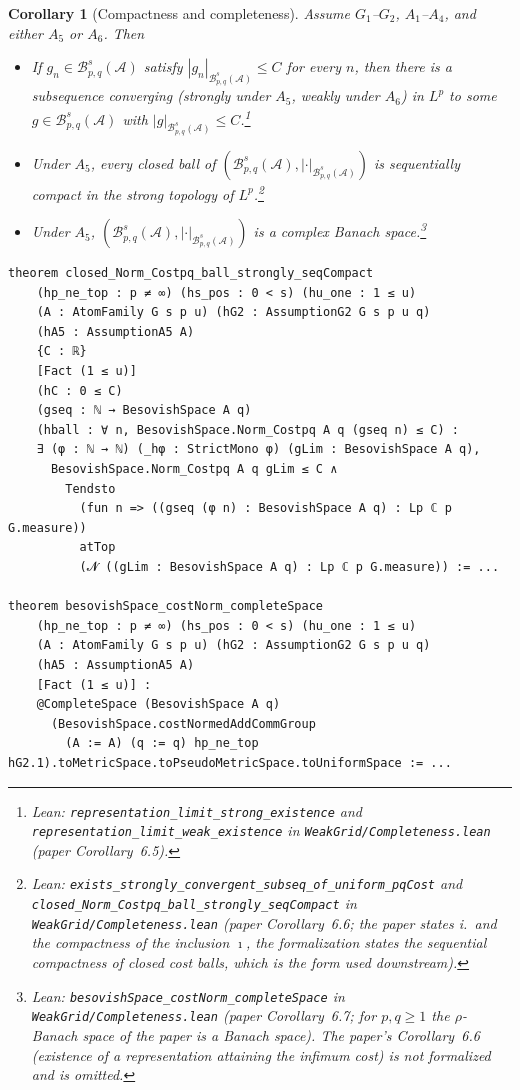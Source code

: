 \documentclass[11pt]{amsart}
\newtheorem{corollary}[theorem]{Corollary}
\theoremstyle{definition}
\newcommand{\lean}[1]{\texttt{#1}}
\begin{document}
\begin{corollary}[Compactness and completeness]\label{compa1}
Assume $G_1$--$G_2$, $A_1$--$A_4$, and either $A_5$ or $A_6$. Then
\begin{itemize}
\item[i.] If $g_n \in \mathcal{B}^s_{p,q}(\mathcal{A})$ satisfy
$|g_n|_{\mathcal{B}^s_{p,q}(\mathcal{A})}\leq C$ for every $n$, then there is
a subsequence converging (strongly under $A_5$, weakly under $A_6$) in $L^p$
to some $g \in \mathcal{B}^s_{p,q}(\mathcal{A})$ with
$|g|_{\mathcal{B}^s_{p,q}(\mathcal{A})}\leq C$.\footnote{Lean:
\lean{representation\_limit\_strong\_existence} and
\lean{representation\_limit\_weak\_existence} in
\lean{WeakGrid/Completeness.lean} (paper Corollary~6.5).}
\item[ii.] Under $A_5$, every closed ball of
$(\mathcal{B}^s_{p,q}(\mathcal{A}),|\cdot|_{\mathcal{B}^s_{p,q}(\mathcal{A})})$
is sequentially compact in the strong topology of
$L^p$.\footnote{Lean: \lean{exists\_strongly\_convergent\_subseq\_of\_uniform\_pqCost}
and \lean{closed\_Norm\_Costpq\_ball\_strongly\_seqCompact} in
\lean{WeakGrid/Completeness.lean} (paper Corollary~6.6; the paper states
i.\ and the compactness of the inclusion $\imath$, the formalization states
the sequential compactness of closed cost balls, which is the form used
downstream).}
\item[iii.] Under $A_5$,
$(\mathcal{B}^s_{p,q}(\mathcal{A}),|\cdot|_{\mathcal{B}^s_{p,q}(\mathcal{A})})$
is a complex Banach space.\footnote{Lean:
\lean{besovishSpace\_costNorm\_completeSpace} in
\lean{WeakGrid/Completeness.lean} (paper Corollary~6.7; for $p,q \geq 1$ the
$\rho$-Banach space of the paper is a Banach space). The paper's
Corollary~6.6 (existence of a representation attaining the infimum cost) is
not formalized and is omitted.}
\end{itemize}
\end{corollary}
\begin{lstlisting}[style=lean]
theorem closed_Norm_Costpq_ball_strongly_seqCompact
    (hp_ne_top : p ≠ ∞) (hs_pos : 0 < s) (hu_one : 1 ≤ u)
    (A : AtomFamily G s p u) (hG2 : AssumptionG2 G s p u q)
    (hA5 : AssumptionA5 A)
    {C : ℝ}
    [Fact (1 ≤ u)]
    (hC : 0 ≤ C)
    (gseq : ℕ → BesovishSpace A q)
    (hball : ∀ n, BesovishSpace.Norm_Costpq A q (gseq n) ≤ C) :
    ∃ (φ : ℕ → ℕ) (_hφ : StrictMono φ) (gLim : BesovishSpace A q),
      BesovishSpace.Norm_Costpq A q gLim ≤ C ∧
        Tendsto
          (fun n => ((gseq (φ n) : BesovishSpace A q) : Lp ℂ p G.measure))
          atTop
          (𝓝 ((gLim : BesovishSpace A q) : Lp ℂ p G.measure)) := ...

theorem besovishSpace_costNorm_completeSpace
    (hp_ne_top : p ≠ ∞) (hs_pos : 0 < s) (hu_one : 1 ≤ u)
    (A : AtomFamily G s p u) (hG2 : AssumptionG2 G s p u q)
    (hA5 : AssumptionA5 A)
    [Fact (1 ≤ u)] :
    @CompleteSpace (BesovishSpace A q)
      (BesovishSpace.costNormedAddCommGroup
        (A := A) (q := q) hp_ne_top hG2.1).toMetricSpace.toPseudoMetricSpace.toUniformSpace := ...
\end{lstlisting}
\end{document}
